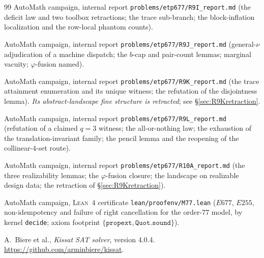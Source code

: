 \documentclass[11pt]{article}
\theoremstyle{plain}
\theoremstyle{definition}
\theoremstyle{remark}
\numberwithin{equation}{section}
\begin{document}
\begin{thebibliography}{99}
AutoMath campaign, internal report \texttt{problems\slash etp677\slash R9I\_report.md}
(the deficit law and two toolbox retractions; the trace sub-branch; the block-inflation
localization and the row-local phantom counts).

AutoMath campaign, internal report \texttt{problems\slash etp677\slash R9J\_report.md}
(general-$\nu$ adjudication of a machine dispatch; the $b$-cap and pair-count lemmas;
marginal vacuity; $\varphi$-fusion named).

AutoMath campaign, internal report \texttt{problems\slash etp677\slash R9K\_report.md}
(the trace attainment enumeration and its unique witness; the refutation of the
disjointness lemma). \emph{Its abstract-landscape fine structure is retracted}; see
\S\ref{sec:R9Kretraction}.

AutoMath campaign, internal report \texttt{problems\slash etp677\slash R9L\_report.md}
(refutation of a claimed $q = 3$ witness; the all-or-nothing law; the exhaustion of the
translation-invariant family; the pencil lemma and the reopening of the collinear-$4$-set
route).

AutoMath campaign, internal report \texttt{problems\slash etp677\slash R10A\_report.md}
(the three realizability lemmas; the $\varphi$-fusion closure; the landscape on realizable
design data; the retraction of \S\ref{sec:R9Kretraction}).

AutoMath campaign, \textsc{Lean}~4 certificate \texttt{lean\slash proofenv\slash M77.lean}
($E677$, $E255$, non-idempotency and failure of right cancellation for the
order-$77$ model, by kernel \texttt{decide}; axiom footprint
$\{\texttt{propext},\texttt{Quot.sound}\}$).

A.~Biere et al., \emph{Kissat SAT solver}, version 4.0.4.
\url{https://github.com/arminbiere/kissat}.

\end{thebibliography}
\end{document}

